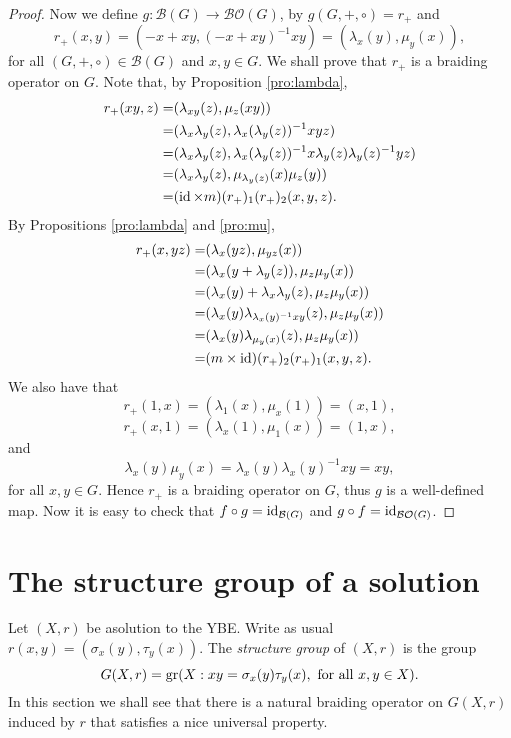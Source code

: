 \begin{proof}
Now we define $g\colon \mathcal{B}(G)\rightarrow \mathcal{BO}(G)$, by $g(G,+,\circ)=r_+$ and
\[ r_+(x,y)=(-x+xy,(-x+xy)^{-1}xy)=(\lambda_x(y),\mu_y(x)),\]
for all $(G,+,\circ)\in\mathcal{B}(G)$ and $x,y\in G$. We shall prove that $r_+$ is a braiding operator on $G$. Note that, by Proposition \ref{pro:lambda}, 
\begin{align*}
    r_+(xy,z)=&(\lambda_{xy}(z),\mu_z(xy))\\
    =&(\lambda_x\lambda_y(z),\lambda_x(\lambda_y(z))^{-1}xyz)\\
    =&(\lambda_x\lambda_y(z),\lambda_x(\lambda_y(z))^{-1}x\lambda_y(z)\lambda_y(z)^{-1}yz)\\
    =&(\lambda_x\lambda_y(z),\mu_{\lambda_y(z)}(x)\mu_z(y))\\
    =&(\operatorname{id}\times m)(r_+)_1(r_+)_2(x,y,z).
\end{align*}
By Propositions \ref{pro:lambda} and \ref{pro:mu},
\begin{align*}
    r_+(x,yz)=&(\lambda_{x}(yz),\mu_{yz}(x))\\
    =&(\lambda_x(y+\lambda_y(z)),\mu_z\mu_y(x))\\
    =&(\lambda_x(y)+\lambda_x\lambda_y(z),\mu_z\mu_y(x))\\
    =&(\lambda_x(y)\lambda_{\lambda_x(y)^{-1}xy}(z),\mu_z\mu_y(x))\\
    =&(\lambda_x(y)\lambda_{\mu_y(x)}(z),\mu_z\mu_y(x))\\
    =&(m\times \operatorname{id})(r_+)_2(r_+)_1(x,y,z).
\end{align*}
We also have that
\[ r_+(1,x)=(\lambda_1(x),\mu_x(1))=(x,1),\]
\[ r_+(x,1)=(\lambda_x(1),\mu_1(x))=(1,x),\]
and
\[ \lambda_x(y)\mu_y(x)=\lambda_x(y)\lambda_x(y)^{-1}xy=xy,\]
for all $x,y\in G$. Hence $r_+$ is a braiding operator on $G$, thus $g$ is a well-defined map. Now it is easy to check that $f\circ g=\operatorname{id}_{\mathcal{B}(G)}$ and $g\circ f=\operatorname{id}_{\mathcal{BO}(G)}$.
\end{proof}

\section*{The structure group of a solution}
Let $(X,r)$ be asolution to the YBE. Write as usual $r(x,y)=(\sigma_x(y),\tau_y(x))$. The {\em structure group} of $(X,r)$ is the group
\[ G(X,r)=\operatorname{gr}(X : xy=\sigma_x(y)\tau_y(x), \text{ for all }x,y\in X).\]
In this section we shall see that there is a natural braiding operator on $G(X,r)$ induced by $r$ that satisfies a nice universal property. 

